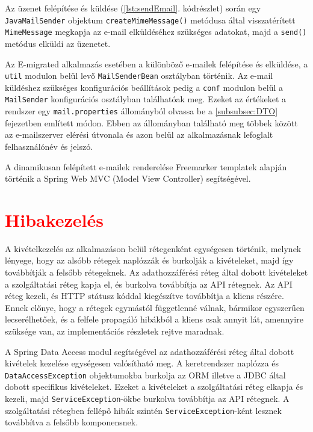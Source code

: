 \begin{reviewed}
Az üzenet felépítése és küldése (\ref{lst:sendEmail}. kódrészlet) során egy \texttt{JavaMailSender} objektum \texttt{createMimeMessage()} metódusa által visszatérített \texttt{MimeMessage} megkapja az e-mail elküldéséhez szükséges adatokat, majd a \texttt{send()} metódus elküldi az üzenetet. 

Az E-migrated alkalmazás esetében a különböző e-mailek felépítése és elküldése, a \texttt{util} modulon belül levő \texttt{MailSenderBean} osztályban történik. Az e-mail küldéshez szükséges konfigurációs beállítások pedig a \texttt{conf} modulon belül a \texttt{MailSender} konfigurációs osztályban találhatóak meg. Ezeket az értékeket a rendszer egy \texttt{mail.properties} állományból olvassa be a \ref{subsubsec:DTO} fejezetben említett módon. Ebben az állományban található meg többek között az e-mailszerver elérési útvonala és azon belül az alkalmazásnak lefoglalt felhasználónév és jelszó.

A dinamikusan felépített e-mailek renderelése Freemarker templatek alapján történik a Spring Web MVC (Model View Controller) segítségével.
\end{reviewed}


\section{\textcolor{red}{Hibakezelés}}
\label{sec:hibakezeles}
A kivételkezelés az alkalmazáson belül rétegenként egységesen történik, melynek lényege, hogy az alsóbb rétegek naplózzák és burkolják a kivételeket, majd így továbbítják a felsőbb rétegeknek. Az adathozzáférési réteg által dobott kivételeket a szolgáltatási réteg kapja el, és burkolva továbbítja az API rétegnek. Az API réteg kezeli, és HTTP státusz kóddal kiegészítve továbbítja a kliens részére. Ennek előnye, hogy a rétegek egymástól függetlenné válnak, bármikor egyszerűen lecserélhetőek, és a felfele propagáló hibákból a kliens csak annyit lát, amennyire szüksége van, az implementációs részletek rejtve maradnak. 

A Spring Data Access modul segítségével az adathozzáférési réteg által dobott kivételek kezelése egységesen valósítható meg. A keretrendszer naplózza és \texttt{DataAccessException} objektumokba burkolja az ORM illetve a JDBC által dobott specifikus kivételeket. Ezeket a kivételeket a szolgáltatási réteg elkapja és kezeli, majd \texttt{ServiceException}-ökbe burkolva továbbítja az API rétegnek. A szolgáltatási rétegben fellépő hibák szintén \texttt{ServiceException}-ként lesznek továbbítva a felsőbb komponensnek. 

